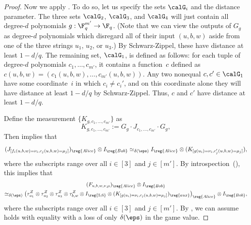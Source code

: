 \begin{proof}
Now we apply .
To do so, let us specify the sets $\calG_i$ and the distance parameter.
The three sets $\calG_2$, $\calG_3$, and $\calG_4$ will just contain all degree-$d$ polynomials $g:\F_q^{m'} \rightarrow \F_q$.
(Note that we can view the outputs of $G_g$ as degree-$d$ polynomials which disregard all of their input $(u, b, w)$ aside from one of the three strings $u_1$, $u_2$, or $u_3$.)
By Schwarz-Zippel, these have distance at least $1-d/q$.
The remaining set, $\calG_1$, is defined as follows:
for each tuple of degree-$d$ polynomials $c_1, \ldots, c_{m'}$,
it contains a function~$c$ defined as $c(u, b, w) = (c_1(u, b, w), \ldots, c_{m'}(u, b, w))$.
Any two nonequal $c, c' \in \calG_1$ have some coordinate~$i$ in which $c_i \neq c_i'$,
and on this coordinate alone they will have distance at least $1-d/q$ by Schwarz-Zippel.
Thus, $c$ and $c'$ have distance at least $1-d/q$.


Define the measurement $\{K_{g, c_1, \ldots, c_{m'}}\}$ as 
\begin{equation*}
K_{g, c_1, \ldots, c_{m'}} := G_g \cdot J_{c_1, \ldots, c_{m'}} \cdot G_g,
\end{equation*}
Then  implies that
\begin{equation*}
(J_{[f_i(u, b, w) = \nu_i, c_j(u, b, w) = \mu_j]})_{\reg{Alice}} \otimes I_{\reg{Bob}} \simeq_{\delta(\eps)} I_{\reg{Alice}} \otimes (K_{[g(u_i) = \nu_i, c_j'(u, b, w) = \mu_j]}),
\end{equation*}
where the subscripts range over all $i \in [3]$ and $j \in [m']$.
By introspection~(), this implies that
\begin{multline}\label{eq:cant-believe-it-but-we-did-it}
(F_{u, b, w, \nu, \mu})_{\reg{Alice}} \otimes I_{\reg{Bob}}\\
\simeq_{\delta(\eps)}
\left(\tau^Z_{u_1} \otimes \tau^Z_{u_2} \otimes \tau^Z_{u_3} \otimes \tau^Z_{b, w}
	\otimes I_{\reg{5,6}} \otimes (K_{[g(u_i) = \nu_i, c_j(u, b, w) = \mu_j]})_{\reg{aux}}\right)_{\reg{Alice}} \otimes I_{\reg{Bob}},
\end{multline}
where the subscripts range over all $i \in [3]$ and $j \in [m']$.
By , we can assume  holds with equality
with a loss of only $\delta(\eps)$ in the game value.


\end{proof}
